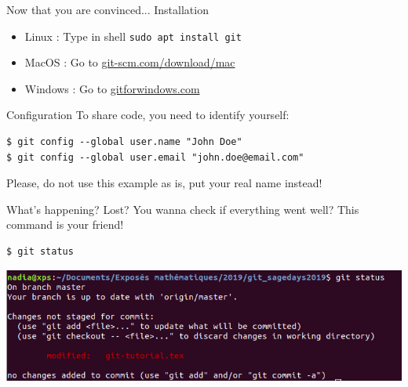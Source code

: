 \documentclass{beamer}
\begin{document}
	\begin{frame}{Now that you are convinced... Installation}
		\begin{itemize}
			\item Linux : Type in shell \texttt{sudo apt install git}
			\item MacOS : Go to \url{git-scm.com/download/mac}
			\item Windows : Go to \url{gitforwindows.com}
		\end{itemize}
	\end{frame}

	\begin{frame}[fragile]{Configuration}
	To share code, you need to identify yourself:
	\begin{verbatim}
$ git config --global user.name "John Doe"
$ git config --global user.email "john.doe@email.com"
	\end{verbatim}
	Please, do not use this example as is, put your real name instead!
	\end{frame}

	\begin{frame}[fragile]{What's happening?}
		Lost? You wanna check if everything went well? This command is your friend!
		\begin{verbatim}
$ git status
		\end{verbatim}
		\begin{center}
			\includegraphics[width=\linewidth]{status}
		\end{center}
	\end{frame}
\end{document}

